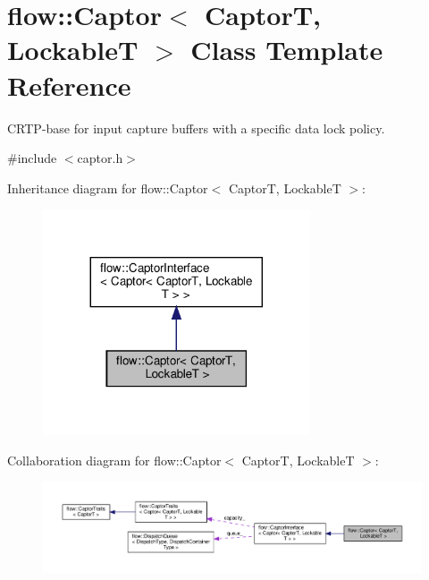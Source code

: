 \hypertarget{classflow_1_1_captor}{}\section{flow\+:\+:Captor$<$ CaptorT, LockableT $>$ Class Template Reference}
\label{classflow_1_1_captor}


C\+R\+T\+P-\/base for input capture buffers with a specific data lock policy.  




{\ttfamily \#include $<$captor.\+h$>$}



Inheritance diagram for flow\+:\+:Captor$<$ CaptorT, LockableT $>$\+:\nopagebreak
\begin{figure}[H]
\begin{center}
\leavevmode
\includegraphics[width=224pt]{classflow_1_1_captor__inherit__graph}
\end{center}
\end{figure}


Collaboration diagram for flow\+:\+:Captor$<$ CaptorT, LockableT $>$\+:\nopagebreak
\begin{figure}[H]
\begin{center}
\leavevmode
\includegraphics[width=350pt]{classflow_1_1_captor__coll__graph}
\end{center}
\end{figure}
